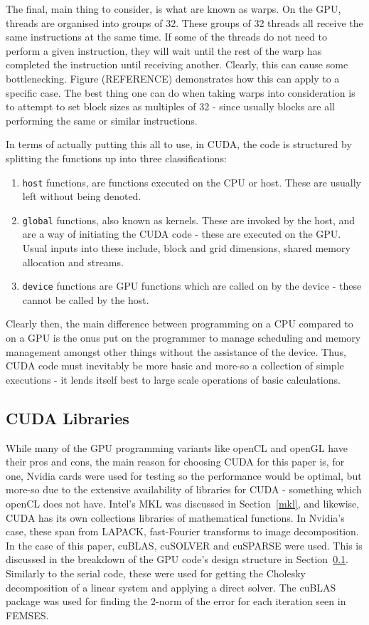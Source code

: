 The final, main thing to consider, is what are known as warps. On the GPU, threads are organised into groups of 32. These groups of 32 threads all receive the same instructions at the same time. If some of the threads do not need to perform a given instruction, they will wait until the rest of the warp has completed the instruction until receiving another. Clearly, this can cause some bottlenecking. Figure (REFERENCE) demonstrates how this can apply to a specific case. The best thing one can do when taking warps into consideration is to attempt to set block sizes as multiples of 32 - since usually blocks are all performing the same or similar instructions.

In terms of actually putting this all to use, in CUDA, the code is structured by splitting the functions up into three classifications:
\begin{enumerate}
	\item \texttt{\twound host\twound} functions, are functions executed on the CPU or host. These are usually left without being denoted.
	\item \texttt{\twound global\twound} functions, also known as kernels. These are invoked by the host, and are a way of initiating the CUDA code - these are executed on the GPU. Usual inputs into these include, block and grid dimensions, shared memory allocation and streams.
	\item \texttt{\twound device\twound} functions are GPU functions which are called on by the device - these cannot be called by the host.
\end{enumerate}
Clearly then, the main difference between programming on a CPU compared to on a GPU is the onus put on the programmer to manage scheduling and memory management amongst other things without the assistance of the device. Thus, CUDA code must inevitably be more basic and more-so a collection of simple executions - it lends itself best to large scale operations of basic calculations.

\subsection{CUDA Libraries}\label{culibs}

While many of the GPU programming variants like openCL and openGL have their pros and cons, the main reason for choosing CUDA for this paper is, for one, Nvidia cards were used for testing so the performance would be optimal, but more-so due to the extensive availability of libraries for CUDA - something which openCL does not have. Intel's MKL was discussed in Section~\ref{mkl}, and likewise, CUDA has its own collections libraries of mathematical functions. In Nvidia's case, these span from LAPACK, fast-Fourier transforms to image decomposition. In the case of this paper, cuBLAS, cuSOLVER and cuSPARSE were used. This is discussed in the breakdown of the GPU code's design structure in Section~\ref{culibs}. Similarly to the serial code, these were used for getting the Cholesky decomposition of a linear system and applying a direct solver. The cuBLAS package was used for finding the 2-norm of the error for each iteration seen in FEMSES.

